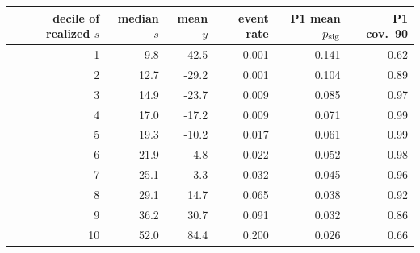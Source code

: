 \begin{tabular}{rrrrrr}
\toprule
decile of realized $s$ & median $s$ & mean $y$ & event rate & P1 mean $p_{\mathrm{sig}}$ & P1 cov.\ 90 \\
\midrule
1 & 9.8 & -42.5 & 0.001 & 0.141 & 0.62 \\
2 & 12.7 & -29.2 & 0.001 & 0.104 & 0.89 \\
3 & 14.9 & -23.7 & 0.009 & 0.085 & 0.97 \\
4 & 17.0 & -17.2 & 0.009 & 0.071 & 0.99 \\
5 & 19.3 & -10.2 & 0.017 & 0.061 & 0.99 \\
6 & 21.9 & -4.8 & 0.022 & 0.052 & 0.98 \\
7 & 25.1 & 3.3 & 0.032 & 0.045 & 0.96 \\
8 & 29.1 & 14.7 & 0.065 & 0.038 & 0.92 \\
9 & 36.2 & 30.7 & 0.091 & 0.032 & 0.86 \\
10 & 52.0 & 84.4 & 0.200 & 0.026 & 0.66 \\
\bottomrule
\end{tabular}
